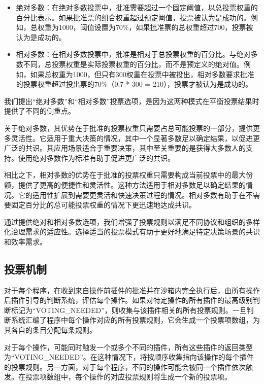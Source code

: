 \documentclass[main.tex]{subfiles}
\begin{document}
\begin{itemize}
    \item 绝对多数：在绝对多数投票中，批准需要超过一个固定阈值，以总投票权重的百分比表示。如果批准票的组合权重超过预定阈值，投票被认为是成功的。例如，总权重为1000，阈值设置为70\%，如果批准票的总权重超过700，投票被认为是成功的。

    \item 相对多数：在相对多数投票中，批准是相对于总投票权重的百分比。与绝对多数不同，总投票权重是实际投票权重的百分比，而不是预定义的绝对值。例如，如果总权重为1000，但只有300权重在投票中被投出，相对多数要求批准的投票权重超过投出票的70\%（0.7 * 300 = 210），投票才被认为是成功的。
\end{itemize}


我们提出“绝对多数”和“相对多数”投票选项，是因为这两种模式在平衡投票结果时提供了不同的侧重点。

关于绝对多数，其优势在于批准的投票权重只需要占总可能投票的一部分，提供更多灵活性。它适用于重大决策的情况，其中一个显著多数足以确定结果，以促进更广泛的共识。其应用场景适合于重要决策，其中至关重要的是获得大多数人的支持。使用绝对多数作为标准有助于促进更广泛的共识。

相比之下，相对多数的优势在于批准的投票权重只需要构成当前投票中的最大份额，提供了更高的便捷性和灵活性。这种方法适用于相对多数足以确定结果的情况。它的适用性扩展到需要更灵活和快速决策过程的情况。相对多数有助于在不需要固定百分比的总可能投票权重的情况下更迅速地达成共识。

通过提供绝对和相对多数选项，我们增强了投票规则以满足不同协议和组织的多样化治理需求的适应性。选择适当的投票模式有助于更好地满足特定决策场景的共识和效率需求。

\subsection{投票机制}

对于每个程序，在收到来自操作前插件的批准并在沙箱内完全执行后，由所有操作后插件引导的判断系统，评估每个操作。如果对特定操作的所有插件的最高级别判断标记为“VOTING\_NEEDED”，则收集与该插件相关的所有投票规则。一旦判断系统汇编了程序中每个操作对应的所有投票规则，它会生成一个投票项数组，为其各自的条目分配每条规则。

对于每个操作，可能同时触发一个或多个不同的插件，所有这些插件的返回类型为“VOTING\_NEEDED”。在这种情况下，将按顺序收集指向该操作的每个插件的投票规则。另一方面，对于每个程序，不同的操作可能会被同一个插件依次触发。在投票项数组中，每个操作的对应投票规则将生成一个新的投票项。
\end{document}
